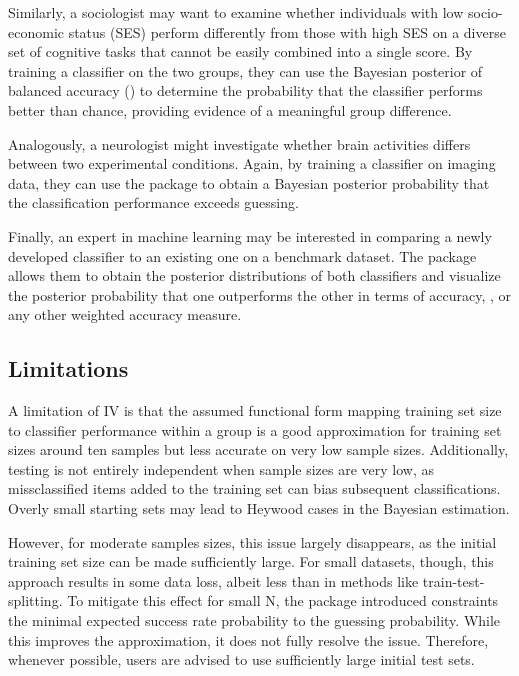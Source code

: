 \documentclass[article]{jss}
\begin{document}
Similarly, a sociologist may want to examine whether individuals with low socio-economic status (SES) perform differently from those with high SES on a diverse set of cognitive tasks that cannot be easily combined into a single score. By training a classifier on the two groups, they can use the Bayesian posterior of balanced accuracy () to determine the probability that the classifier performs better than chance, providing evidence of a meaningful group difference.

Analogously, a neurologist might investigate whether brain activities differs between two experimental conditions. Again, by training a classifier on imaging data, they can use the package to obtain a Bayesian posterior probability that the classification performance exceeds guessing.

Finally, an expert in machine learning may be interested in comparing a newly developed classifier to an existing one on a benchmark dataset. The package allows them to obtain the posterior distributions of both classifiers and visualize the posterior probability that one outperforms the other in terms of accuracy, , or any other weighted accuracy measure.

\subsection{Limitations} \label{sec:limitations}
A limitation of IV is that the assumed functional form mapping training set size to classifier performance within a group is a good approximation for training set sizes around ten samples but less accurate on very low sample sizes. Additionally, testing is not entirely independent when sample sizes are very low, as missclassified items added to the training set can bias subsequent classifications. Overly small starting sets may lead to Heywood cases in the Bayesian estimation.

However, for moderate samples sizes, this issue largely disappears, as the initial training set size can be made sufficiently large. For small datasets, though, this approach results in some data loss, albeit less than in methods like train-test-splitting. To mitigate this effect for small N, the  package introduced constraints the minimal expected success rate probability to the guessing probability. While this improves the approximation, it does not fully resolve the issue. Therefore, whenever possible, users are advised to use sufficiently large initial test sets.
\end{document}
